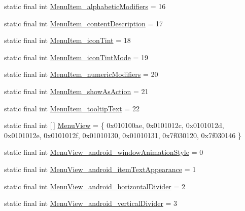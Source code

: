 \begin{DoxyCompactItemize}
\item 
static final int \mbox{\hyperlink{classcom_1_1google_1_1android_1_1gms_1_1R_1_1styleable_a19a7012c3800ab137c125a03c891f497}{Menu\+Item\+\_\+alphabetic\+Modifiers}} = 16
\item 
static final int \mbox{\hyperlink{classcom_1_1google_1_1android_1_1gms_1_1R_1_1styleable_af790ad2072702d734ef3187904afc7b0}{Menu\+Item\+\_\+content\+Description}} = 17
\item 
static final int \mbox{\hyperlink{classcom_1_1google_1_1android_1_1gms_1_1R_1_1styleable_a575b89869023239bb9b68c7f74d6fa1a}{Menu\+Item\+\_\+icon\+Tint}} = 18
\item 
static final int \mbox{\hyperlink{classcom_1_1google_1_1android_1_1gms_1_1R_1_1styleable_a2b2a83fa54a6a0d2a398e003753e3174}{Menu\+Item\+\_\+icon\+Tint\+Mode}} = 19
\item 
static final int \mbox{\hyperlink{classcom_1_1google_1_1android_1_1gms_1_1R_1_1styleable_acbe25f97d1795fe06da9d16e15777961}{Menu\+Item\+\_\+numeric\+Modifiers}} = 20
\item 
static final int \mbox{\hyperlink{classcom_1_1google_1_1android_1_1gms_1_1R_1_1styleable_a7abac00fc638c05defec18aeae897aea}{Menu\+Item\+\_\+show\+As\+Action}} = 21
\item 
static final int \mbox{\hyperlink{classcom_1_1google_1_1android_1_1gms_1_1R_1_1styleable_a756d3bd29df91e8ab6db509de34d899e}{Menu\+Item\+\_\+tooltip\+Text}} = 22
\item 
static final int \mbox{[}$\,$\mbox{]} \mbox{\hyperlink{classcom_1_1google_1_1android_1_1gms_1_1R_1_1styleable_ad3bbdb13e5e7d395491d3bb5f87caf98}{Menu\+View}} = \{ 0x010100ae, 0x0101012c, 0x0101012d, 0x0101012e, 0x0101012f, 0x01010130, 0x01010131, 0x7f030120, 0x7f030146 \}
\item 
static final int \mbox{\hyperlink{classcom_1_1google_1_1android_1_1gms_1_1R_1_1styleable_ae5f8f4a25c2b0a641f8defe778e67367}{Menu\+View\+\_\+android\+\_\+window\+Animation\+Style}} = 0
\item 
static final int \mbox{\hyperlink{classcom_1_1google_1_1android_1_1gms_1_1R_1_1styleable_a5585293f66427676c9f5c730599dd70d}{Menu\+View\+\_\+android\+\_\+item\+Text\+Appearance}} = 1
\item 
static final int \mbox{\hyperlink{classcom_1_1google_1_1android_1_1gms_1_1R_1_1styleable_ac7163171f36d97d9b9e8fa6ea2ca3abe}{Menu\+View\+\_\+android\+\_\+horizontal\+Divider}} = 2
\item 
static final int \mbox{\hyperlink{classcom_1_1google_1_1android_1_1gms_1_1R_1_1styleable_ae0c38eaf9e32dfc179b6800748817290}{Menu\+View\+\_\+android\+\_\+vertical\+Divider}} = 3

\end{DoxyCompactItemize}
